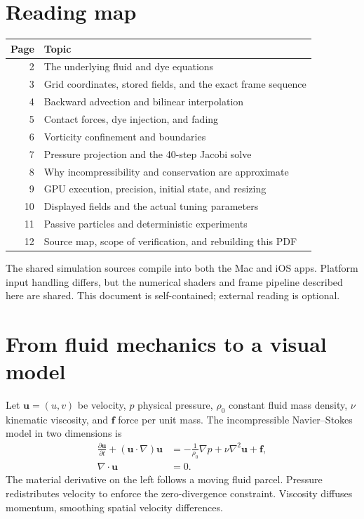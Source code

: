 \documentclass[11pt,a4paper]{article}
\newcommand{\uvec}{\mathbf{u}}
\newcommand{\page}[1]{\clearpage\section{#1}}
\begin{document}
\section*{Reading map}
\begin{tabularx}{\linewidth}{@{}rY@{}}
\toprule
Page & Topic \\
 & The underlying fluid and dye equations \\
3 & Grid coordinates, stored fields, and the exact frame sequence \\
4 & Backward advection and bilinear interpolation \\
5 & Contact forces, dye injection, and fading \\
6 & Vorticity confinement and boundaries \\
7 & Pressure projection and the 40-step Jacobi solve \\
8 & Why incompressibility and conservation are approximate \\
9 & GPU execution, precision, initial state, and resizing \\
10 & Displayed fields and the actual tuning parameters \\
11 & Passive particles and deterministic experiments \\
12 & Source map, scope of verification, and rebuilding this PDF \\
\bottomrule
\end{tabularx}

\vfill
{\small The shared simulation sources compile into both the Mac and iOS apps.
Platform input handling differs, but the numerical shaders and frame pipeline
described here are shared. This document is self-contained; external reading is
optional.}

\page{From fluid mechanics to a visual model}
Let $\uvec=(u,v)$ be velocity, $p$ physical pressure, $\rho_0$ constant fluid mass
density, $\nu$ kinematic viscosity, and $\mathbf f$ force per unit mass. The
incompressible Navier--Stokes model in two dimensions is
\begin{align}
 \frac{\partial\uvec}{\partial t}+(\uvec\cdot\nabla)\uvec
 &= -\frac{1}{\rho_0}\nabla p+\nu\nabla^2\uvec+\mathbf f,
 \label{eq:ns}\\
 \nabla\cdot\uvec&=0.\label{eq:incompressible}
\end{align}
The material derivative on the left follows a moving fluid parcel. Pressure
redistributes velocity to enforce the zero-divergence constraint. Viscosity
diffuses momentum, smoothing spatial velocity differences.
\end{document}
